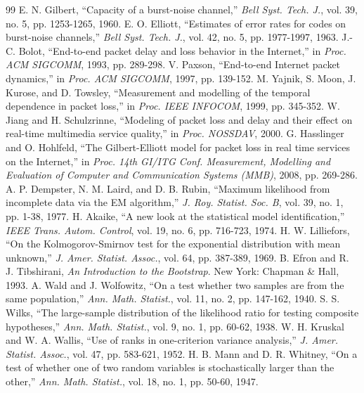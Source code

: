 \documentclass[conference]{IEEEtran}
\begin{document}
\begin{thebibliography}{99}
 E. N. Gilbert, ``Capacity of a burst-noise channel,'' \emph{Bell Syst. Tech. J.}, vol. 39, no. 5, pp. 1253-1265, 1960.
 E. O. Elliott, ``Estimates of error rates for codes on burst-noise channels,'' \emph{Bell Syst. Tech. J.}, vol. 42, no. 5, pp. 1977-1997, 1963.
 J.-C. Bolot, ``End-to-end packet delay and loss behavior in the Internet,'' in \emph{Proc. ACM SIGCOMM}, 1993, pp. 289-298.
 V. Paxson, ``End-to-end Internet packet dynamics,'' in \emph{Proc. ACM SIGCOMM}, 1997, pp. 139-152.
 M. Yajnik, S. Moon, J. Kurose, and D. Towsley, ``Measurement and modelling of the temporal dependence in packet loss,'' in \emph{Proc. IEEE INFOCOM}, 1999, pp. 345-352.
 W. Jiang and H. Schulzrinne, ``Modeling of packet loss and delay and their effect on real-time multimedia service quality,'' in \emph{Proc. NOSSDAV}, 2000.
 G. Hasslinger and O. Hohlfeld, ``The Gilbert-Elliott model for packet loss in real time services on the Internet,'' in \emph{Proc. 14th GI/ITG Conf. Measurement, Modelling and Evaluation of Computer and Communication Systems (MMB)}, 2008, pp. 269-286.
 A. P. Dempster, N. M. Laird, and D. B. Rubin, ``Maximum likelihood from incomplete data via the EM algorithm,'' \emph{J. Roy. Statist. Soc. B}, vol. 39, no. 1, pp. 1-38, 1977.
 H. Akaike, ``A new look at the statistical model identification,'' \emph{IEEE Trans. Autom. Control}, vol. 19, no. 6, pp. 716-723, 1974.
 H. W. Lilliefors, ``On the Kolmogorov-Smirnov test for the exponential distribution with mean unknown,'' \emph{J. Amer. Statist. Assoc.}, vol. 64, pp. 387-389, 1969.
 B. Efron and R. J. Tibshirani, \emph{An Introduction to the Bootstrap}. New York: Chapman \& Hall, 1993.
 A. Wald and J. Wolfowitz, ``On a test whether two samples are from the same population,'' \emph{Ann. Math. Statist.}, vol. 11, no. 2, pp. 147-162, 1940.
 S. S. Wilks, ``The large-sample distribution of the likelihood ratio for testing composite hypotheses,'' \emph{Ann. Math. Statist.}, vol. 9, no. 1, pp. 60-62, 1938.
 W. H. Kruskal and W. A. Wallis, ``Use of ranks in one-criterion variance analysis,'' \emph{J. Amer. Statist. Assoc.}, vol. 47, pp. 583-621, 1952.
 H. B. Mann and D. R. Whitney, ``On a test of whether one of two random variables is stochastically larger than the other,'' \emph{Ann. Math. Statist.}, vol. 18, no. 1, pp. 50-60, 1947.

\end{thebibliography}
\end{document}
